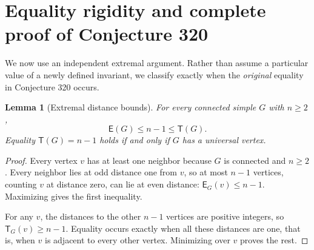 \documentclass[11pt,a4paper]{article}
\newtheorem{lemma}[theorem]{Lemma}
\theoremstyle{definition}\newtheorem{definition}[theorem]{Definition}
\theoremstyle{remark}\newtheorem{remark}[theorem]{Remark}
\newcommand{\epar}{\mathsf E}
\newcommand{\trans}{\mathsf T}
\begin{document}
\section{Equality rigidity and complete proof of Conjecture 320}
We now use an independent extremal argument. Rather than assume a particular value of a newly defined invariant, we classify exactly when the \emph{original} equality in Conjecture 320 occurs.

\begin{lemma}[Extremal distance bounds]\label{lem:extremal}
For every connected simple $G$ with $n\ge2$,
\begin{equation}\label{eq:extreme}
\epar(G)\le n-1\le\trans(G).
\end{equation}
Equality $\trans(G)=n-1$ holds if and only if $G$ has a universal vertex.
\end{lemma}
\begin{proof}
Every vertex $v$ has at least one neighbor because $G$ is connected and $n\ge2$. Every neighbor lies at odd distance one from $v$, so at most $n-1$ vertices, counting $v$ at distance zero, can lie at even distance: $\epar_G(v)\le n-1$. Maximizing gives the first inequality.

For any $v$, the distances to the other $n-1$ vertices are positive integers, so $\trans_G(v)\ge n-1$. Equality occurs exactly when all these distances are one, that is, when $v$ is adjacent to every other vertex. Minimizing over $v$ proves the rest.
\end{proof}
\end{document}
